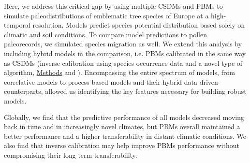 \documentclass[pdflatex, sn-nature]{sn-jnl}%
\begin{document}
Here, we address this critical gap by using multiple CSDMs and PBMs to simulate paleodistributions of emblematic tree species of Europe at a high-temporal resolution. Models predict species potential distribution based solely on climatic and soil conditions. To compare model predictions to pollen paleorecords, we simulated species migration as well. We extend this analysis by including hybrid models in the comparison, i.e. PBMs calibrated in the same way as CSDMs (inverse calibration using species occurrence data and a novel type of algorithm, \hyperref[methods]{Methods} and \citep{VanderMeersch2023}). Encompassing the entire spectrum of models, from correlative models to process-based models and their hybrid data-driven counterparts, allowed us identifying the key features necessary for building robust models. 

Globally, we find that the predictive performance of all models decreased moving back in time and in increasingly novel climates, but PBMs overall maintained a better performance and a higher transferability in distant climatic conditions. We also find that inverse calibration may help improve PBMs performance without compromising their long-term transferability.
\end{document}
